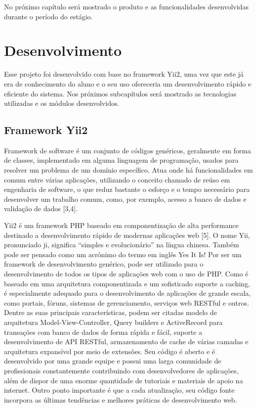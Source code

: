 \documentclass[
	12pt,				%
	openright,			%
	twoside,			%
	a4paper,			%
	english,			%
	french,				%
	spanish,			%
	brazil,				%
	]{abntex2}
\begin{document}
No próximo capítulo será mostrado o produto e as funcionalidades desenvolvidas durante o período do estágio.



\chapter{Desenvolvimento}


Esse projeto foi desenvolvido com base no framework Yii2, uma vez que este já era de conhecimento do aluno e o seu uso ofereceria um desenvolvimento rápido e eficiente do sistema. Nos próximos subcapítulos será mostrado as tecnologias utilizadas e os módulos desenvolvidos.

\section{Framework Yii2}

Framework de software é um conjunto de códigos genéricos, geralmente em forma de classes, implementado em alguma linguagem de programação, usados para resolver um problema de um domínio específico. Atua onde há funcionalidades em comum entre várias aplicações, utilizando o conceito chamado de reúso em engenharia de software, o que reduz bastante o esforço e o tempo necessário para desenvolver um trabalho comum, como, por exemplo, acesso a banco de dados e validação de dados [3,4].

Yii2 é um framework PHP baseado em componentização de alta performance destinado a desenvolvimento rápido de modernas aplicações web [5]. O nome Yii, pronunciado ji, significa “simples e evolucionário” na língua chinesa. Também pode ser pensado como um acrônimo do termo em inglês Yes It Is! Por ser um framework de desenvolvimento genérico, pode ser utilizado para o desenvolvimento de todos os tipos de aplicações web com o uso de PHP. Como é baseado em uma arquitetura componentizada e um sofisticado suporte a caching, é especialmente adequado para o desenvolvimento de aplicações de grande escala, como portais, fóruns, sistemas de gerenciamento, serviços web RESTful e outros. Dentre as suas principais características, podem ser citadas modelo de arquitetura Model-View-Controller, Query builders e ActiveRecord para transações com banco de dados de forma rápida e fácil, suporte a desenvolvimento de API RESTful, armazenamento de cache de várias camadas e arquitetura expansível por meio de extensões. Seu código é aberto e é desenvolvido por uma grande equipe e possui uma larga comunidade de profissionais constantemente contribuindo com desenvolvedores de aplicações, além de dispor de uma enorme quantidade de tutoriais e materiais de apoio na internet. Outro ponto importante é que a cada atualização, seu código fonte incorpora as últimas tendências e melhores práticas de desenvolvimento web.
\end{document}

